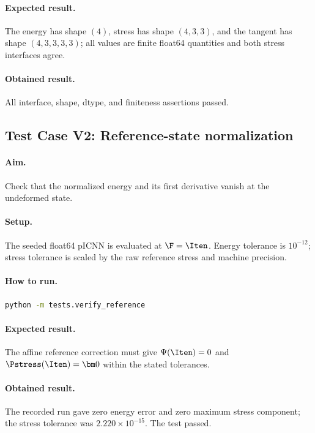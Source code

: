 \paragraph{Expected result.}
The energy has shape \((4)\), stress has shape \((4,3,3)\), and the tangent
has shape \((4,3,3,3,3)\); all values are finite float64 quantities and both
stress interfaces agree.

\paragraph{Obtained result.}
All interface, shape, dtype, and finiteness assertions passed.

\subsection*{Test Case V2: Reference-state normalization}
\paragraph{Aim.}
Check that the normalized energy and its first derivative vanish at the
undeformed state.

\paragraph{Setup.}
The seeded float64 pICNN is evaluated at \(\F=\Iten\). Energy tolerance is
\(10^{-12}\); stress tolerance is scaled by the raw reference stress and
machine precision.

\paragraph{How to run.}
\begin{lstlisting}[language=bash]
python -m tests.verify_reference
\end{lstlisting}

\paragraph{Expected result.}
The affine reference correction must give \(\Psi(\Iten)=0\) and
\(\Pstress(\Iten)=\bm 0\) within the stated tolerances.

\paragraph{Obtained result.}
The recorded run gave zero energy error and zero maximum stress component;
the stress tolerance was \(2.220\times10^{-15}\). The test passed.

